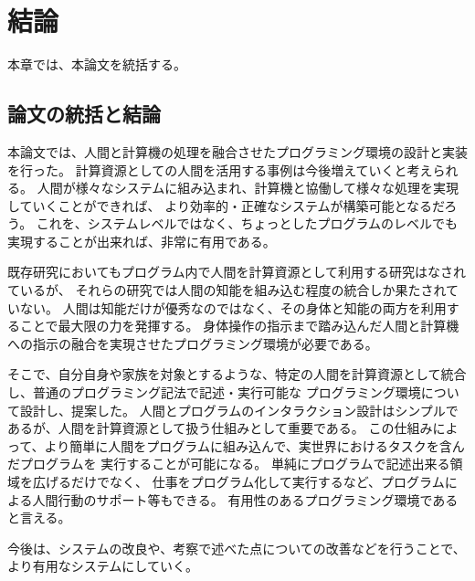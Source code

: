 \chapter{結論}\label{chap:conclusion}

本章では、本論文を統括する。

\section{論文の統括と結論}\label{ux8ad6ux6587ux306eux7d71ux62ecux3068ux7d50ux8ad6}

本論文では、人間と計算機の処理を融合させたプログラミング環境の設計と実装を行った。
計算資源としての人間を活用する事例は今後増えていくと考えられる。
人間が様々なシステムに組み込まれ、計算機と協働して様々な処理を実現していくことができれば、
より効率的・正確なシステムが構築可能となるだろう。
これを、システムレベルではなく、ちょっとしたプログラムのレベルでも実現することが出来れば、非常に有用である。

既存研究においてもプログラム内で人間を計算資源として利用する研究はなされているが、
それらの研究では人間の知能を組み込む程度の統合しか果たされていない。
人間は知能だけが優秀なのではなく、その身体と知能の両方を利用することで最大限の力を発揮する。
身体操作の指示まで踏み込んだ人間と計算機への指示の融合を実現させたプログラミング環境が必要である。

そこで、自分自身や家族を対象とするような、特定の人間を計算資源として統合し、普通のプログラミング記法で記述・実行可能な
プログラミング環境について設計し、提案した。
人間とプログラムのインタラクション設計はシンプルであるが、人間を計算資源として扱う仕組みとして重要である。
この仕組みによって、より簡単に人間をプログラムに組み込んで、実世界におけるタスクを含んだプログラムを
実行することが可能になる。
単純にプログラムで記述出来る領域を広げるだけでなく、
仕事をプログラム化して実行するなど、プログラムによる人間行動のサポート等もできる。
有用性のあるプログラミング環境であると言える。

今後は、システムの改良や、考察で述べた点についての改善などを行うことで、
より有用なシステムにしていく。
